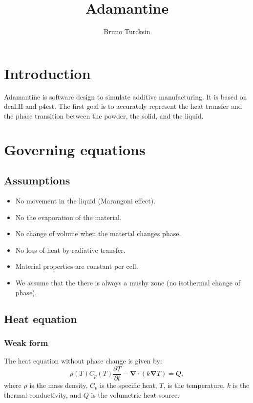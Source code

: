 \documentclass[letterpaper]{article}
\newcommand\bn{\boldsymbol{\nabla}}
\renewcommand{\(}{\left(}
\renewcommand{\)}{\right)}
\renewcommand{\[}{\left[}
\renewcommand{\]}{\right]}
\begin{document}
\title{Adamantine}
\author{Bruno Turcksin} 
\date{}
\maketitle

\section{Introduction}
Adamantine is software design to simulate additive manufacturing. It is based on
deal.II and p4est. The first goal is to accurately represent the heat transfer
and the phase transition between the powder, the solid, and the liquid.

\section{Governing equations}
\subsection{Assumptions}
\begin{itemize}
  \item No movement in the liquid (Marangoni effect).
  \item No the evaporation of the material.
  \item No change of volume when the material changes phase.
  \item No loss of heat by radiative transfer.
  \item Material properties are constant per cell.
  \item We assume that the there is always a mushy zone (no isothermal change
    of phase).
\end{itemize}
\subsection{Heat equation}
\subsubsection{Weak form}
The heat equation without phase change is given by:
\begin{equation}
  \rho(T) C_p(T) \frac{\partial T}{\partial t} - \bn \cdot \(k\bn T\) = Q,
\end{equation}
where $\rho$ is the mass density, $C_p$ is the specific heat, $T$, is the
temperature, $k$ is the thermal conductivity, and $Q$ is the volumetric heat
source.
\end{document}
